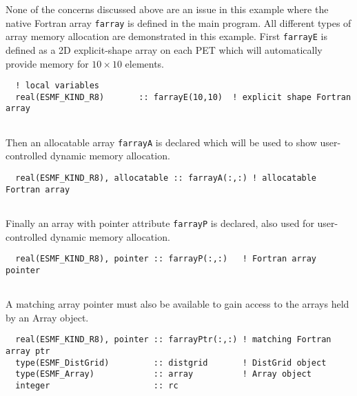    None of the concerns discussed above are an issue in this example where the
   native Fortran array {\tt farray} is defined in the main program. All
   different types of array memory allocation are demonstrated in this example.
   First {\tt farrayE} is defined as a 2D explicit-shape array on each PET which 
   will automatically provide memory for $10\times 10$ elements. 

 \begin{verbatim}
  ! local variables
  real(ESMF_KIND_R8)       :: farrayE(10,10)  ! explicit shape Fortran array
 
\end{verbatim}
 

   Then an allocatable array {\tt farrayA} is declared which will be used
   to show user-controlled dynamic memory allocation. 

 \begin{verbatim}
  real(ESMF_KIND_R8), allocatable :: farrayA(:,:) ! allocatable Fortran array
 
\end{verbatim}
 

   Finally an array with pointer attribute {\tt farrayP} is declared, also used
   for user-controlled dynamic memory allocation. 

 \begin{verbatim}
  real(ESMF_KIND_R8), pointer :: farrayP(:,:)   ! Fortran array pointer 
 
\end{verbatim}
 

   A matching array pointer must also be available to gain access to the arrays
   held by an Array object. 

 \begin{verbatim}
  real(ESMF_KIND_R8), pointer :: farrayPtr(:,:) ! matching Fortran array ptr 
  type(ESMF_DistGrid)         :: distgrid       ! DistGrid object
  type(ESMF_Array)            :: array          ! Array object
  integer                     :: rc
  
 
\end{verbatim}
 
